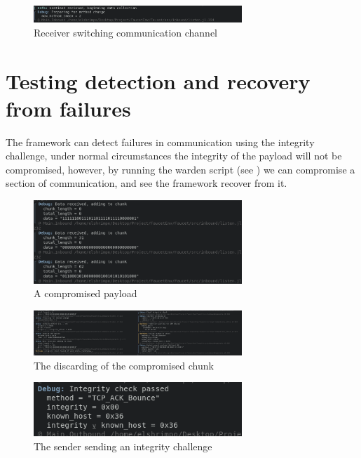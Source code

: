 \begin{figure}[h]
    \centering
    \includegraphics[width=0.7\textwidth]{fig/receiver_adapt.png}
    \caption{Receiver switching communication channel}
    \label{fig:recv_switch}
\end{figure}

\section{Testing detection and recovery from failures}
\label{sec:soft_failure_recovery}

The framework can detect failures in communication using the integrity challenge, under normal circumstances the integrity of the payload will not be compromised, however, by running the warden script (see ) we can compromise a section of communication, and see the framework recover from it.

\begin{figure}[h]
    \centering
    \includegraphics[width=0.7\textwidth]{fig/poison_tcp.png}
    \caption{A compromised payload}
    \label{fig:poison_tcp}
\end{figure}

\begin{figure}
    \centering
    \includegraphics[width=0.7\textwidth]{fig/discard_posioned_chunk.png}
    \caption{The discarding of the compromised chunk}
    \label{fig:discard_poison}
\end{figure}


\begin{figure}
    \centering
    \includegraphics[width=0.7\textwidth]{fig/integrity_challenge.png}
    \caption{The sender sending an integrity challenge}
    \label{fig:integrity_challenge}
\end{figure}

